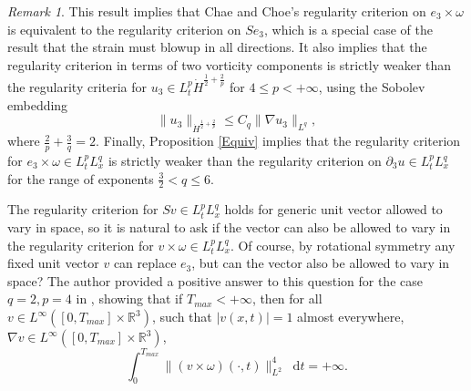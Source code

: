 \documentclass[11pt]{article}
\theoremstyle{plain}
\theoremstyle{remark}
\newtheorem{remark}[theorem]{Remark}
\numberwithin{equation}{section}
\newcommand{\diff}{\mathop{}\!\mathrm{d}}
\begin{document}
\begin{remark}
This result implies that Chae and Choe's regularity criterion on $e_3\times \omega$ is equivalent to the regularity criterion on $Se_3$, which is a special case of the result that the strain must blowup in all directions. It also implies that the regularity criterion in terms of two vorticity components is strictly weaker than the regularity criteria for $u_3 \in L^p_t \dot{H}^{\frac{1}{2}+\frac{2}{p}}$ for $4\leq p<+\infty$, using the Sobolev embedding
\begin{equation}
    \|u_3\|_{\dot{H}^{\frac{1}{2}+\frac{2}{p}}}
    \leq C_q \|\nabla u_3\|_{L^q},
\end{equation}
where $\frac{2}{p}+\frac{3}{q}=2$.
Finally, Proposition \ref{Equiv} implies that the regularity criterion for 
$e_3\times \omega\in L^p_t L^q_x$ is strictly weaker than the regularity criterion on $\partial_3 u\in L^p_tL^q_x$ for the range of exponents $\frac{3}{2}<q\leq 6$.
\end{remark}

The regularity criterion for $Sv \in L^p_t L^q_x$ holds for generic unit vector allowed to vary in space, so it is natural to ask if the vector can also be allowed to vary in the regularity criterion for $v\times \omega \in L^p_tL^q_x$. Of course, by rotational symmetry any fixed unit vector $v$ can replace $e_3$, but can the vector also be allowed to vary in space? The author provided a positive answer to this question for the case $q=2, p=4$ in \cite{MillerAnisoVort}, showing that if $T_{max}<+\infty$, then for all 
$v\in L^\infty\left(
[0,T_{max}]\times\mathbb{R}^3\right)$, such that $|v(x,t)|=1$ almost everywhere, 
$\nabla v \in L^\infty\left(
[0,T_{max}]\times \mathbb{R}^3\right)$,
\begin{equation} \label{LocalAnisoVort}
    \int_0^{T_{max}}\|(v\times\omega)(\cdot,t)
    \|_{L^2}^4 \diff t=+\infty.
\end{equation}
\end{document}
